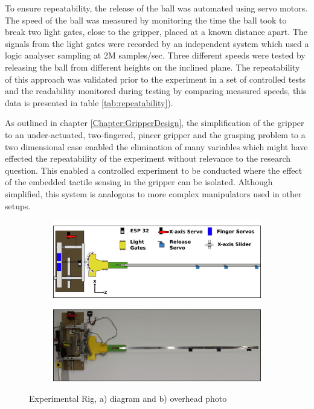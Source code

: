 To ensure repeatability, the release of the ball was automated using servo motors. The speed of the ball was measured by monitoring the time the ball took to break two light gates, close to the gripper, placed at a known distance apart. The signals from the light gates were recorded by an independent system which used a logic analyser sampling at 2M samples/sec. Three different speeds were tested by releasing the ball from different heights on the inclined plane. The repeatability of this approach was validated prior to the experiment in a set of controlled tests and the readability monitored during testing by comparing measured speeds, this data is presented in table \ref{tab:repeatability}).

As outlined in chapter \ref{Chapter:GripperDesign}, the simplification of the gripper to an under-actuated, two-fingered, pincer gripper and the grasping problem to a two dimensional case enabled the elimination of many variables which might have effected the repeatability of the experiment without relevance to the research question. This enabled a controlled experiment to be conducted where the effect of the embedded tactile sensing in the gripper can be isolated. Although simplified, this system is analogous to more complex manipulators used in other setups. 

\begin{figure}[ht]
    \centering
    \begin{subfigure}{.8\linewidth}
        \centering
        \includegraphics[width=\textwidth]{Images/FinalRig.png}
        \caption{}
        \label{subfigure:RigDiagram}
    \end{subfigure}
    \begin{subfigure}{.8\linewidth}
        \centering
    \includegraphics[width=\textwidth]{Images/RIG.png}
        \caption{}
        \label{subfigure:RigPhoto}
    \end{subfigure}
    \caption{Experimental Rig, a) diagram and b) overhead photo}
\label{fig:FullRig}
\end{figure}

